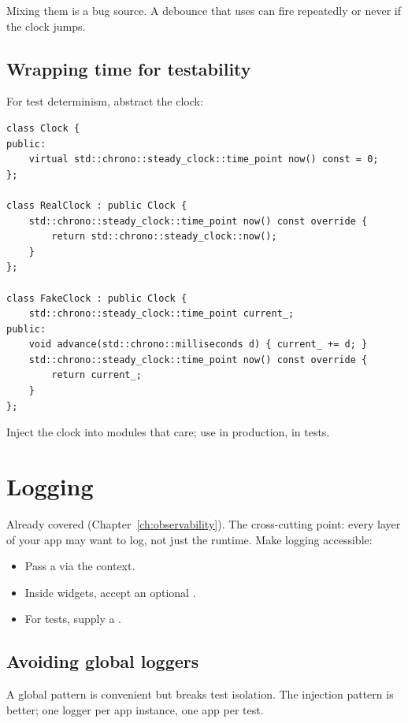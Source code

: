 Mixing them is a bug source. A debounce that uses
 can fire repeatedly or never if the clock
jumps.

\subsection*{Wrapping time for testability}

For test determinism, abstract the clock:

\begin{lstlisting}
class Clock {
public:
    virtual std::chrono::steady_clock::time_point now() const = 0;
};

class RealClock : public Clock {
    std::chrono::steady_clock::time_point now() const override {
        return std::chrono::steady_clock::now();
    }
};

class FakeClock : public Clock {
    std::chrono::steady_clock::time_point current_;
public:
    void advance(std::chrono::milliseconds d) { current_ += d; }
    std::chrono::steady_clock::time_point now() const override {
        return current_;
    }
};
\end{lstlisting}

Inject the clock into modules that care; use 
in production,  in tests.

\section{Logging}

Already covered (Chapter~\ref{ch:observability}). The
cross-cutting point: every layer of your app may want to log,
not just the runtime. Make logging accessible:

\begin{itemize}[leftmargin=*]
  \item Pass a  via the context.
  \item Inside widgets, accept an optional .
  \item For tests, supply a .
\end{itemize}

\subsection*{Avoiding global loggers}

A global  pattern is convenient but
breaks test isolation. The injection pattern is better; one
logger per app instance, one app per test.

